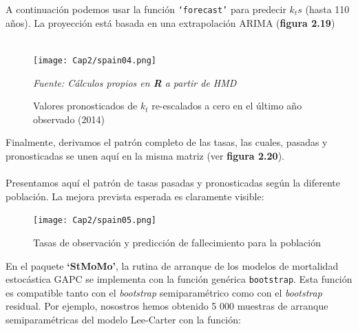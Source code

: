 A continuación podemos usar la función \texttt{`forecast'} para predecir $k_{t}s$ (hasta 110 años). La proyección está basada en una extrapolación ARIMA (\textbf{figura 2.19})\\

{
\setlength{\fboxsep}{0.75pt}%
\noindent\setlength{\fboxrule}{0pt}%
}\\

\begin{figure}[!htp]
\centering
\hspace*{-1cm}
\texttt{[image: Cap2/spain04.png]}
\caption{Valores pronosticados de $k_{t}$ re-escalados a cero en el último año observado (2014)}
\textit{Fuente: Cálculos propios en \textbf{R} a partir de HMD}
\end{figure}

Finalmente, derivamos el patrón completo de las tasas, las cuales, pasadas y pronosticadas se unen aquí en la misma matriz (ver \textbf{figura 2.20}).\\

{
\setlength{\fboxsep}{0.75pt}%
\noindent\setlength{\fboxrule}{0pt}%
}\\

\newpage
Presentamos aquí el patrón de tasas pasadas y pronosticadas según la diferente población. La mejora prevista esperada es claramente visible:

\begin{figure}[!htp]
\centering
\texttt{[image: Cap2/spain05.png]}
\captionsetup{width=1.1\linewidth}
\caption{Tasas de observación y predicción de fallecimiento para la población}
\end{figure}

En el paquete \textbf{`StMoMo'}, la rutina de arranque de los modelos de mortalidad estocástica GAPC se implementa con la función genérica \texttt{bootstrap}. Esta función es compatible tanto con el \textit{bootstrap} semiparamétrico como con el \textit{bootstrap} residual. Por ejemplo, nosostros hemos obtenido 5 000 muestras de arranque semiparamétricas del modelo Lee-Carter con la función:\\

